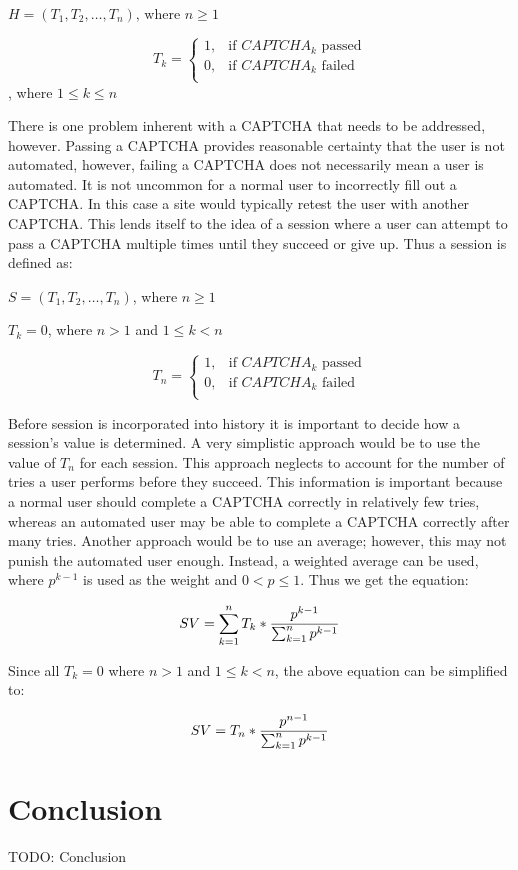 \documentclass[journal, 12pt, onecolumn, draftclsnofoot]{IEEEtran}
\begin{document}
$H = (T_1,T_2,\ldots,T_n )\text{, where }n \geq 1$

\[
T_k =
  \begin{cases}
    1, &\text{if $CAPTCHA_k$ passed}\\
    0, &\text{if $CAPTCHA_k$ failed}\\
  \end{cases}
\], where $1 \leq k \leq n$

There is one problem inherent with a CAPTCHA that needs to be addressed, however. Passing a CAPTCHA provides reasonable certainty that the user is not automated, however, failing a CAPTCHA does not necessarily mean a user is automated. It is not uncommon for a normal user to incorrectly fill out a CAPTCHA. In this case a site would typically retest the user with another CAPTCHA. This lends itself to the idea of a session where a user can attempt to pass a CAPTCHA multiple times until they succeed or give up. Thus a session is defined as:

$S=(T_1,T_2,\ldots,T_n )$, where $n \geq 1$

$T_k = 0$, where $n > 1$ and $1 \leq k < n$

\[
T_n =
  \begin{cases}
    1, &\text{if $CAPTCHA_k$ passed}\\
    0, &\text{if $CAPTCHA_k$ failed}\\
  \end{cases}
\]

Before session is incorporated into history it is important to decide how a session’s value is determined. A very simplistic approach would be to use the value of $T_n$ for each session. This approach neglects to account for the number of tries a user performs before they succeed. This information is important because a normal user should complete a CAPTCHA correctly in relatively few tries, whereas an automated user may be able to complete a CAPTCHA correctly after many tries. Another approach would be to use an average; however, this may not punish the automated user enough. Instead, a weighted average can be used, where $p^{k-1}$ is used as the weight and $0 < p \leq 1$. Thus we get the equation:
	
\[
  SV =
    \sum_{k=1}^n T_k * {
      p^{k-1} \over \sum_{k=1}^n p^{k-1}
    }
\]

	Since all $T_k = 0$ where $n > 1$ and $1 \leq k < n$, the above equation can be simplified to:

\[
  SV = 
    T_n * {
      p^{n - 1} \over \sum_{k=1}^n p^{k-1}
    }
\]



\section{Conclusion}
\label{Conclusion}

TODO: Conclusion

\newpage



\end{document}
